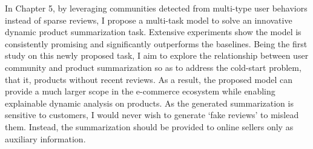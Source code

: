 In Chapter 5, by leveraging communities detected from multi-type user behaviors instead of sparse reviews, I propose a multi-task model to solve an innovative dynamic product summarization task. Extensive experiments show the model is consistently promising and significantly outperforms the baselines.  Being the first study on this newly proposed task, I aim to explore the relationship between user community and product summarization so as to address the cold-start problem, that it, products without recent reviews. As a result, the proposed model can provide a much larger scope in the e-commerce ecosystem while enabling explainable dynamic analysis on products.   As the generated summarization is sensitive to customers, I would never wish to generate ‘fake reviews’ to mislead them. Instead, the summarization should be provided to online sellers only as auxiliary information.
